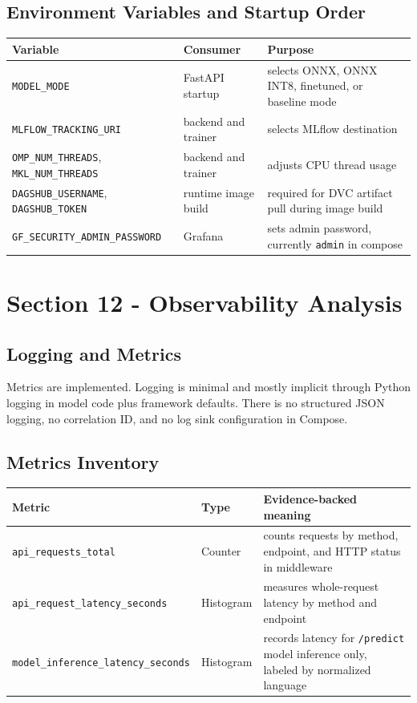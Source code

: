 \subsection{Environment Variables and Startup Order}
\begin{table}[H]
\centering
\begin{tabularx}{\textwidth}{@{}l l X@{}}
\toprule
\textbf{Variable} & \textbf{Consumer} & \textbf{Purpose} \\
\midrule
\texttt{MODEL\_MODE} & FastAPI startup & selects ONNX, ONNX INT8, finetuned, or baseline mode \\
\texttt{MLFLOW\_TRACKING\_URI} & backend and trainer & selects MLflow destination \\
\texttt{OMP\_NUM\_THREADS}, \texttt{MKL\_NUM\_THREADS} & backend and trainer & adjusts CPU thread usage \\
\texttt{DAGSHUB\_USERNAME}, \texttt{DAGSHUB\_TOKEN} & runtime image build & required for DVC artifact pull during image build \\
\texttt{GF\_SECURITY\_ADMIN\_PASSWORD} & Grafana & sets admin password, currently \texttt{admin} in compose \\
\bottomrule
\end{tabularx}
\end{table}

\section{Section 12 - Observability Analysis}
\subsection{Logging and Metrics}
Metrics are implemented. Logging is minimal and mostly implicit through Python logging in model code plus framework defaults. There is no structured JSON logging, no correlation ID, and no log sink configuration in Compose.

\subsection{Metrics Inventory}
\begin{table}[H]
\centering
\begin{tabularx}{\textwidth}{@{}l l X@{}}
\toprule
\textbf{Metric} & \textbf{Type} & \textbf{Evidence-backed meaning} \\
\midrule
\texttt{api\_requests\_total} & Counter & counts requests by method, endpoint, and HTTP status in middleware \\
\texttt{api\_request\_latency\_seconds} & Histogram & measures whole-request latency by method and endpoint \\
\texttt{model\_inference\_latency\_seconds} & Histogram & records latency for \texttt{/predict} model inference only, labeled by normalized language \\
\bottomrule
\end{tabularx}
\end{table}

